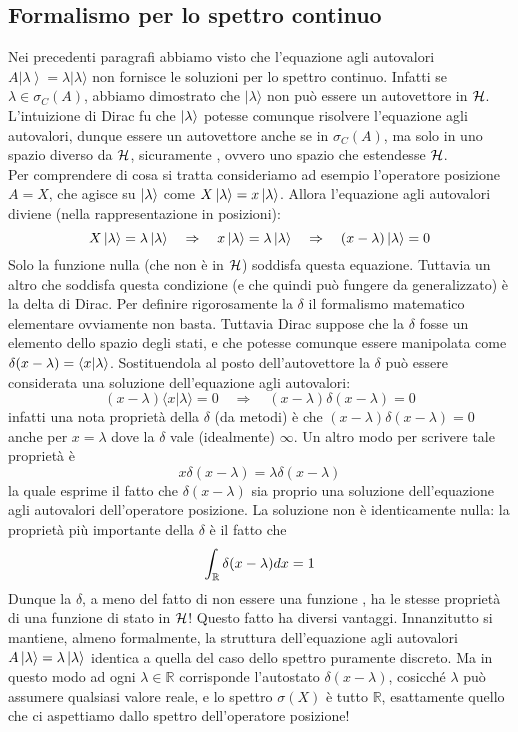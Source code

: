 \documentclass[../../FisicaTeorica.tex]{subfiles}
\begin{document}
\subsection{Formalismo per lo spettro continuo}
Nei precedenti paragrafi abbiamo visto che  l'equazione agli autovalori $A\left|\lambda\right\rangle=\lambda |\lambda  \rangle$ non fornisce le soluzioni per lo spettro continuo.
Infatti se $\lambda \in \sigma_C(A)$, abbiamo dimostrato che $|\lambda\rangle$ non può essere un autovettore in $\mathcal{H}$.
L'intuizione di Dirac fu che $\ket{\lambda}$ potesse comunque risolvere l'equazione agli autovalori, dunque essere un autovettore anche se in $\sigma_C(A)$, ma solo in uno spazio diverso da $\mathcal{H}$, sicuramente , ovvero uno spazio che estendesse $\mathcal{H}$.\\
Per comprendere di cosa si tratta consideriamo ad esempio l'operatore posizione $A=X$, che agisce su $\ket{\lambda}$ come $X\ket{\lambda} = x \ket{\lambda}$. Allora l'equazione agli autovalori diviene (nella rappresentazione in posizioni):
\[
X\ket{\lambda} = \lambda\ket{\lambda} \quad \Rightarrow \quad x\ket{\lambda} = \lambda\ket{\lambda} \quad \Rightarrow \quad (x-\lambda)\ket{\lambda} = 0
\]
Solo la funzione nulla (che non è in $\mathcal{H}$) soddisfa questa equazione. Tuttavia un altro  che soddisfa questa condizione (e che quindi può fungere da  generalizzato) è la delta di Dirac. Per definire rigorosamente la $\delta$ il formalismo matematico elementare ovviamente non basta. Tuttavia Dirac suppose che la $\delta$ fosse un  elemento dello spazio degli stati, e che potesse comunque essere manipolata come  $\delta(x-\lambda) = \braket{x|\lambda}$. Sostituendola al posto dell'autovettore la $\delta$ può essere considerata una soluzione dell'equazione agli autovalori:
\[
(x-\lambda )\langle x | \lambda \rangle = 0 \quad \Rightarrow \quad (x-\lambda)\delta(x-\lambda) = 0
\]
infatti una nota proprietà della $\delta$ (da metodi) è che $(x - \lambda) \delta(x - \lambda) = 0$ anche per $x = \lambda$ dove la $\delta$ vale (idealmente) $\infty$. Un altro modo per scrivere tale proprietà è
\[
x \delta(x - \lambda) = \lambda \delta(x - \lambda)
\]
la quale esprime il fatto che $\delta(x - \lambda)$ sia proprio una soluzione dell'equazione agli autovalori dell'operatore posizione.
La soluzione non è identicamente nulla: la proprietà più importante della $\delta$ è il fatto che
\[
\int_{\mathbb R} \delta(x - \lambda) d x = 1
\]
Dunque la $\delta$, a meno del fatto di non essere una funzione , ha le stesse proprietà di una funzione di stato  in $\mathcal{H}$! Questo fatto ha diversi vantaggi. Innanzitutto si mantiene, almeno formalmente, la struttura dell'equazione agli autovalori $A\ket{\lambda} = \lambda \ket{\lambda}$ identica a quella del caso dello spettro puramente discreto. Ma in questo modo ad ogni $\lambda \in \mathbb R$ corrisponde l'autostato  $\delta(x - \lambda)$, cosicché $\lambda$ può assumere qualsiasi valore reale, e lo spettro $\sigma(X)$ è tutto $\mathbb R$, esattamente quello che ci aspettiamo dallo spettro dell'operatore posizione!
\end{document}
